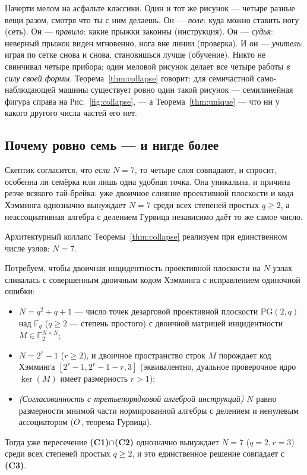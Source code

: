 \begin{zerobox}
Начерти мелом на асфальте классики. Один и тот же рисунок --- четыре разные
вещи разом, смотря что ты с ним делаешь. Он --- \emph{поле}: куда можно
ставить ногу (сеть). Он --- \emph{правило}: какие прыжки законны
(инструкция). Он --- \emph{судья}: неверный прыжок виден мгновенно, нога вне
линии (проверка). И он --- \emph{учитель}: играя по сетке снова и снова,
становишься лучше (обучение). Никто не свинчивал четыре прибора; один
меловой рисунок делает все четыре работы \emph{в силу своей формы}.
Теорема~\ref{thm:collapse} говорит: для семичастной само-наблюдающей машины
существует ровно один такой рисунок --- семилинейная фигура справа на
Рис.~\ref{fig:collapse}, --- а Теорема~\ref{thm:unique} --- что ни у какого
другого числа частей его нет.
\end{zerobox}

\subsection{Почему ровно семь --- и нигде более}

Скептик согласится, что \emph{если} $N=7$, то четыре слоя совпадают, и спросит,
особенна ли семёрка или лишь одна удобная точка. Она уникальна, и причина
резче всякого тай-брейка: уже двоичное слияние проективной плоскости и кода
Хэмминга однозначно вынуждает $N=7$ среди всех степеней простых $q\ge 2$, а
неассоциативная алгебра с делением Гурвица независимо даёт то же самое число.

\begin{theorembox}
Архитектурный коллапс Теоремы~\ref{thm:collapse} реализуем при единственном
числе узлов: $N=7$.
\end{theorembox}

\begin{theorem}\label{thm:unique}
Потребуем, чтобы двоичная инцидентность проективной плоскости на $N$ узлах
сливалась с совершенным двоичным кодом Хэмминга с исправлением одиночной ошибки:
\begin{itemize}[leftmargin=1.6em,itemsep=0pt]
  \item[\textbf{(C1)}] $N=q^2+q+1$ --- число точек дезарговой проективной
        плоскости $\mathrm{PG}(2,q)$ над $\mathbb{F}_q$ ($q\ge 2$ --- степень
        простого) с двоичной матрицей инцидентности $M\in\mathbb{F}_2^{N\times N}$;
  \item[\textbf{(C2)}] $N=2^r-1$ ($r\ge 2$), и двоичное пространство строк $M$
        порождает код Хэмминга $[2^r{-}1, 2^r{-}1{-}r, 3]$ (эквивалентно,
        дуальное проверочное ядро $\ker(M)$ имеет размерность $r > 1$);
  \item[\textbf{(C3)}] \emph{(Согласованность с третьепорядковой алгеброй
        инструкций)} $N$ равно размерности мнимой части нормированной алгебры
        с делением и ненулевым ассоциатором ($O$, теорема Гурвица).
\end{itemize}
Тогда уже пересечение \textbf{(C1)}$\cap$\textbf{(C2)} однозначно вынуждает
$N=7$ ($q=2, r=3$) среди всех степеней простых $q\ge 2$, и это единственное
решение совпадает с \textbf{(C3)}.
\end{theorem}

